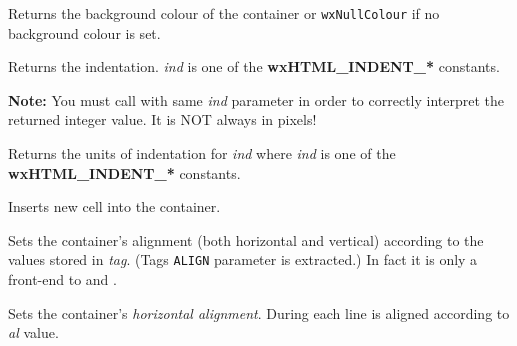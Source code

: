 
Returns the background colour of the container or {\tt wxNullColour} if no background
colour is set.

\label{wxhtmlcontainercellgetindent}


Returns the indentation. {\it ind} is one of the {\bf wxHTML\_INDENT\_*} constants.

{\bf Note:} You must call  
with same {\it ind} parameter in order to correctly interpret the returned integer value.
It is NOT always in pixels!

\label{wxhtmlcontainercellgetindentunits}


Returns the units of indentation for {\it ind} where {\it ind} is one
of the {\bf wxHTML\_INDENT\_*} constants.

\label{wxhtmlcontainercellinsertcell}


Inserts new cell into the container.

\label{wxhtmlcontainercellsetalign}


Sets the container's alignment (both horizontal and vertical) according to
the values stored in {\it tag}. (Tags {\tt ALIGN} parameter is extracted.) In fact
it is only a front-end to  
and .

\label{wxhtmlcontainercellsetalignhor}


Sets the container's {\it horizontal alignment}. During  
each line is aligned according to {\it al} value.




